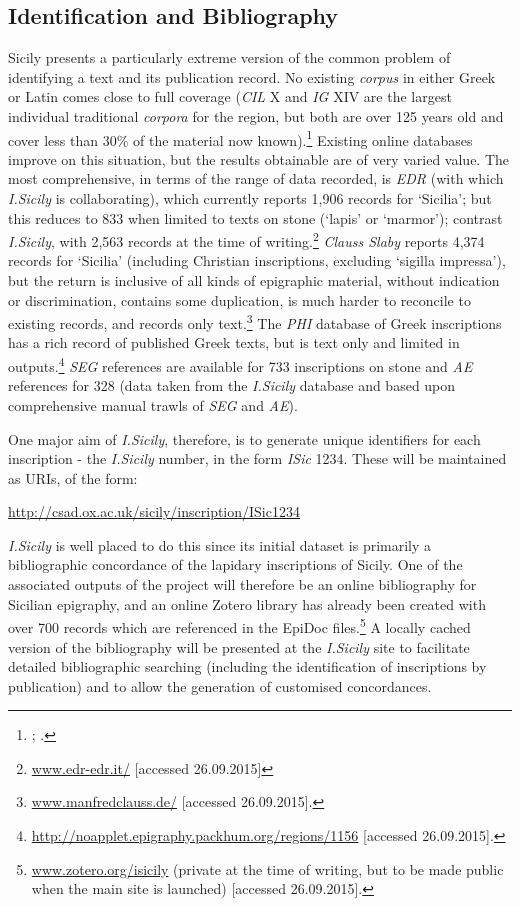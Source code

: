 \documentclass[amsthm,ebook]{saparticle}
\begin{document}
\subsection{Identification and Bibliography}


\noindent Sicily presents a particularly extreme version of the common problem of identifying a text and its publication record.
No existing \emph{corpus} in either Greek or Latin comes close to full coverage (\emph{CIL} X and \emph{IG} XIV are the largest individual
traditional \emph{corpora} for the region, but both are over 125 years old and cover less than 30\% of the material now
known).\footnote{\citet{Mommsen:1883aa}; \citet{kaibel_inscriptiones_1890}.} Existing online databases improve on this situation, but the results
obtainable are of very varied value. The most comprehensive, in terms of the range of data recorded, is \emph{EDR} (with which
\emph{I.Sicily} is collaborating), which currently reports 1,906 records for `Sicilia'; but this reduces to 833 when limited
to texts on stone (`lapis' or `marmor'); contrast \emph{I.Sicily}, with 2,563 records at the time of writing.\footnote{
\url{www.edr-edr.it/} [accessed 26.09.2015]} \emph{Clauss Slaby} reports 4,374 records for `Sicilia' (including Christian
inscriptions, excluding `sigilla impressa'), but the return is inclusive of all kinds of epigraphic material, without
indication or discrimination, contains some duplication, is much harder to reconcile to existing records, and records
only text.\footnote{ \url{www.manfredclauss.de/} [accessed 26.09.2015].} The \emph{PHI} database of Greek inscriptions has a rich
record of published Greek texts, but is text only and limited in outputs.\footnote{
\url{http://noapplet.epigraphy.packhum.org/regions/1156} [accessed 26.09.2015].} \emph{SEG} references are available for 733
inscriptions on stone and \emph{AE} references for 328 (data taken from the \emph{I.Sicily} database and based upon comprehensive
manual trawls of \emph{SEG} and \emph{AE}).

One major aim of \emph{I.Sicily}, therefore, is to generate unique identifiers for each inscription - the \emph{I.Sicily} number, in
the form \emph{ISic} 1234. These will be maintained as URIs, of the form:

\url{http://csad.ox.ac.uk/sicily/inscription/ISic1234}

\emph{I.Sicily} is well placed to do this since its initial dataset is primarily a bibliographic concordance of the lapidary
inscriptions of Sicily. One of the associated outputs of the project will therefore be an online bibliography for
Sicilian epigraphy, and an online Zotero library has already been created with over 700 records which are referenced in
the EpiDoc files.\footnote{\url{www.zotero.org/isicily} (private at the time of writing, but to be made public when the main
site is launched) [accessed 26.09.2015].} A locally cached version of the bibliography will be presented at the
\emph{I.Sicily} site to facilitate detailed bibliographic searching (including the identification of inscriptions by
publication) and to allow the generation of customised concordances.
\end{document}

